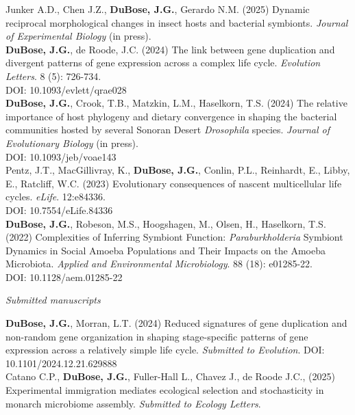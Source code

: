 \documentclass{article}
\begin{document}
\hangindent=0.7cm Junker A.D., Chen J.Z., \textbf{DuBose, J.G.}, Gerardo N.M. (2025) Dynamic reciprocal morphological changes in insect hosts and bacterial symbionts. \emph{Journal of Experimental Biology} (in press). \\

\hangindent=0.7cm \textbf{DuBose, J.G.}, de Roode, J.C. (2024) The link between gene duplication and divergent patterns of gene expression across a complex life cycle. \emph{Evolution Letters}. 8 (5): 726-734. \\
DOI: 10.1093/evlett/qrae028 \\

\hangindent=0.7cm \textbf{DuBose, J.G.}, Crook, T.B., Matzkin, L.M., Haselkorn, T.S. (2024) The relative importance of host phylogeny and dietary convergence in shaping the bacterial communities hosted by several Sonoran Desert \emph{Drosophila} species. \emph{Journal of Evolutionary Biology} (in press).\\ 
DOI: 10.1093/jeb/voae143 \\

\hangindent=0.7cm Pentz, J.T., MacGillivray, K., \textbf{DuBose, J.G.}, Conlin, P.L., Reinhardt, E., Libby, E., Ratcliff, W.C. (2023) Evolutionary consequences of nascent multicellular life cycles. \emph{eLife}. 12:e84336. \\
DOI: 10.7554/eLife.84336 \\

\hangindent=0.7cm \textbf{DuBose, J.G.}, Robeson, M.S., Hoogshagen, M., Olsen, H., Haselkorn, T.S. (2022) Complexities of Inferring Symbiont Function: \emph{Paraburkholderia} Symbiont Dynamics in Social Amoeba Populations and Their Impacts on the Amoeba Microbiota. \emph{Applied and Environmental Microbiology}. 88 (18): e01285-22.\\
DOI: 10.1128/aem.01285-22 \\

\begin{flushleft}
\emph{Submitted manuscripts}
\end{flushleft}

\hangindent=0.7cm \textbf{DuBose, J.G.}, Morran, L.T. (2024) Reduced signatures of gene duplication and non-random gene organization in shaping stage-specific patterns of gene expression across a relatively simple life cycle. \emph{Submitted to Evolution}. 
DOI: 10.1101/2024.12.21.629888 \\

\hangindent=0.7cm Catano C.P., \textbf{DuBose, J.G.}, Fuller-Hall L., Chavez J., de Roode J.C., (2025) Experimental immigration mediates ecological selection and stochasticity in monarch microbiome assembly. \emph{Submitted to Ecology Letters}. \\
\end{document}
